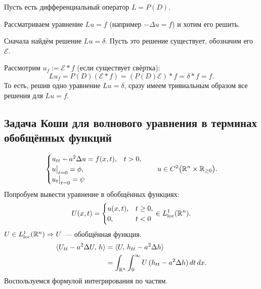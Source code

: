 \documentclass[12pt,a4paper]{article}
\begin{document}
Пусть есть дифференциальный оператор \(L=P(D)\).

Рассматриваем уравнение \(Lu=f\) (например \(-\Delta u=f\))
и хотим его решить.

Сначала найдём решение \(Lu=\delta\).
Пусть это решение существует, обозначим его \(\mathcal{E}\).

Рассмотрим \(u_f:=\mathcal{E}*f\) (если существует свёртка):
\[
Lu_f
=
P(D)(\mathcal{E}*f)
=
(P(D)\mathcal{E})*f
=
\delta*f
=f.
\]
То есть, решив одно уравнение \(Lu=\delta\),
сразу имеем тривиальным образом все решения для \(Lu=f\).



\exr{}{
\[
\begin{cases}
\sum C_k u^{(k)}=0, \\
u^{(k)}=0\quad\forall k<n-1, \\
u^{(n-1)}=1.
\end{cases}
\]
}

\subsection{Задача Коши для волнового уравнения в терминах обобщённых функций}

\[
\begin{cases}
u_{tt}-a^2\Delta u=f(x,t), & t>0, \\
u\big|_{t=0}=\phi, \\
u_t\big|_{t=0}=\psi
\end{cases}
\qquad
u\in C^2\bigl(\mathbb{R}^n\times\mathbb{R}_{\ge 0}\bigr).
\]
Попробуем вывести уравнение в обобщённых функциях:
\[
U(x,t)
=
\begin{cases}
u(x,t), & t\ge 0, \\
0, & t<0
\end{cases}
\in L^1_{\mathrm{loc}}(\mathbb{R}^n).
\]
\(U\in L^1_{\mathrm{loc}}(\mathbb{R}^n)\Rightarrow U\) --- обобщённая функция.
\begin{align*}
\langle U_{tt}-a^2\Delta U,\, h \rangle
&=
\langle U,\, h_{tt}-a^2\Delta h \rangle \\
&=
\int_{\mathbb{R}^n}\int_0^\infty
    U\, (h_{tt}-a^2\Delta h)\, dt\, dx.
\end{align*}
Воспользуемся формулой интегрирования по частям.
\end{document}
